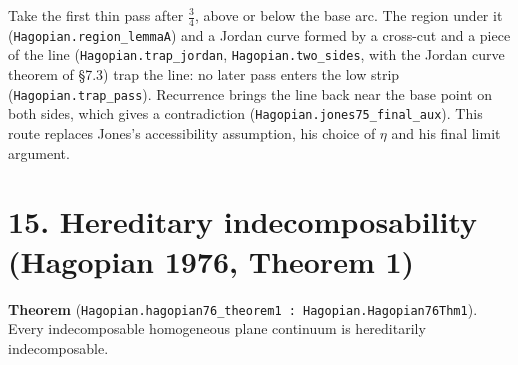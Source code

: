 \documentclass[11pt]{article}
\newcommand{\lean}[1]{\texttt{#1}}
\begin{document}
Take the first thin pass after $\tfrac34$, above or below the base arc. The region under it (\lean{Hagopian.\hspace{0pt}region\_\hspace{0pt}lemmaA}) and a Jordan curve formed by a cross-cut and a piece of the line (\lean{Hagopian.\hspace{0pt}trap\_\hspace{0pt}jordan}, \lean{Hagopian.\hspace{0pt}two\_\hspace{0pt}sides}, with the Jordan curve theorem of \S{}7.3) trap the line: no later pass enters the low strip (\lean{Hagopian.\hspace{0pt}trap\_\hspace{0pt}pass}). Recurrence brings the line back near the base point on both sides, which gives a contradiction (\lean{Hagopian.\hspace{0pt}jones75\_\hspace{0pt}final\_\hspace{0pt}aux}). This route replaces Jones's accessibility assumption, his choice of $\eta$ and his final limit argument.

\section*{15. Hereditary indecomposability (Hagopian 1976, Theorem 1)}

\textbf{Theorem} (\lean{Hagopian.\hspace{0pt}hagopian76\_\hspace{0pt}theorem1 : Hagopian.\hspace{0pt}Hagopian76Thm1}). Every indecomposable homogeneous plane continuum is hereditarily indecomposable.
\end{document}
